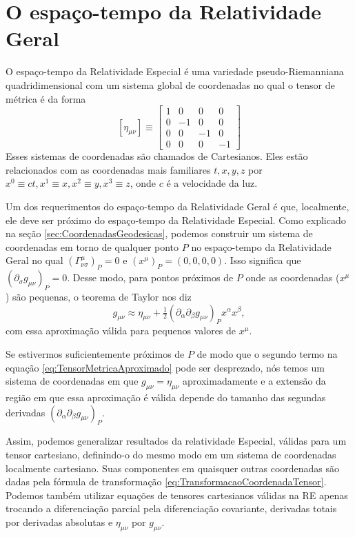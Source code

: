\section{O espaço-tempo da Relatividade Geral}\label{sec:EspacotempoRelatividadeGeral}

O espaço-tempo da Relatividade Especial é uma variedade pseudo-Riemanniana quadridimensional com um sistema global de coordenadas no qual o tensor de métrica é da forma
\[
\left[\eta_{\mu \nu}\right] \equiv\left[\begin{array}{rrrr}{1} & {0} & {0} & {0} \\ {0} & {-1} & {0} & {0} \\ {0} & {0} & {-1} & {0} \\ {0} & {0} & {0} & {-1}\end{array}\right]
\]
Esses sistemas de coordenadas são chamados de Cartesianos. Eles estão relacionados com as coordenadas mais familiares $ t, x, y, z $ por $ x^0 \equiv ct, x^1\equiv x, x^2\equiv y, x^3 \equiv z $, onde $ c $ é a velocidade da luz.

Um dos requerimentos do espaço-tempo da Relatividade Geral é que, localmente, ele deve ser próximo do espaço-tempo da Relatividade Especial.  Como explicado na seção \ref{sec:CoordenadasGeodesicas}, podemos construir um sistema de coordenadas em torno de qualquer ponto $ P $ no espaço-tempo da Relatividade Geral no qual $ \left(\Gamma_{\nu \sigma}^{\mu}\right)_{P}=0 $ e $ \left(x^{\mu}\right)_{P}=(0,0,0,0) $. Isso significa que $ \left(\partial_{\sigma} g_{\mu \nu}\right)_{P}=0 $. Desse modo, para pontos próximos de $ P $ onde as coordenadas ($ x^\mu $) são pequenas, o teorema de Taylor nos diz
\begin{equation}\label{eq:TensorMetricaAproximado}
g_{\mu \nu} \approx \eta_{\mu \nu}+\tfrac{1}{2}\left(\partial_{\alpha} \partial_{\beta} g_{\mu \nu}\right)_{P} x^{\alpha} x^{\beta} ,
\end{equation}
com essa aproximação válida para pequenos valores de $x^\mu$.

Se estivermos suficientemente próximos de $P$ de modo que o segundo termo na equação \eqref{eq:TensorMetricaAproximado} pode ser desprezado, nós temos um sistema de coordenadas em que $g_{\mu\nu}=\eta_{\mu\nu}$ aproximadamente e a extensão da região em que essa aproximação é válida depende do tamanho das segundas derivadas $\left(\partial_{\alpha} \partial_{\beta} g_{\mu \nu}\right)_{P}$. 

Assim, podemos generalizar resultados da relatividade Especial, válidas para um tensor cartesiano, definindo-o do mesmo modo em um sistema de coordenadas localmente cartesiano. Suas componentes em quaisquer outras coordenadas são dadas pela fórmula de transformação \eqref{eq:TransformacaoCoordenadaTensor}. Podemos também utilizar equações de tensores cartesianos válidas na RE apenas trocando a diferenciação parcial pela diferenciação covariante, derivadas totais por derivadas absolutas e $\eta_{\mu\nu}$ por $g_{\mu\nu}$.

